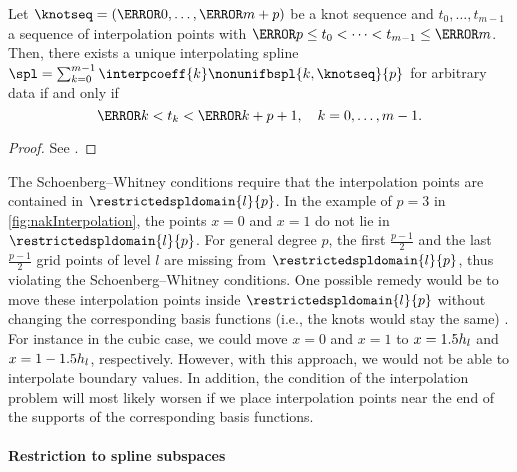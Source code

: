 \begin{proposition}
  Let $\knotseq = (\knot{0}, \dotsc, \knot{m+p})$ be a knot sequence
  and $t_0, \dotsc, t_{m-1}$ a sequence of interpolation points with
  $\knot{p} \le t_0 < \dotsb < t_{m-1} \le \knot{m}$.
  Then, there exists a unique interpolating spline
  $\spl = \sum_{k=0}^{m-1} \interpcoeff{k} \nonunifbspl{k,\knotseq}{p}$
  for arbitrary data if and only if
  \begin{equation}
    \knot{k} < t_k < \knot{k+p+1},\quad
    k = 0, \dotsc, m - 1.
  \end{equation}
\end{proposition}

\begin{proof}
  See \cite{Hoellig13Approximation}.
\end{proof}

The Schoenberg--Whitney conditions require that the interpolation points
are contained in $\restrictedspldomain{l}{p}$.
In the example of $p = 3$ in \cref{fig:nakInterpolation},
the points $x = 0$ and $x = 1$ do not lie in~$\restrictedspldomain{l}{p}$.
For general degree $p$, the first $\tfrac{p-1}{2}$ and the
last $\tfrac{p-1}{2}$ grid points of level $l$ are missing from $\restrictedspldomain{l}{p}$,
thus violating the Schoenberg--Whitney conditions.
One possible remedy would be to move these interpolation points inside
$\restrictedspldomain{l}{p}$ without changing the corresponding basis functions
(i.e., the knots would stay the same) \cite{Hoellig13Approximation}.
For instance in the cubic case, we could move $x = 0$ and $x = 1$ to
$x = 1.5 h_{l}$ and $x = 1 - 1.5 h_{l}$, respectively.
However, with this approach, we would not be able to interpolate
boundary values.
In addition, the condition of the interpolation problem will most likely
worsen if we place interpolation points near the end of the supports
of the corresponding basis functions.

\paragraph{Restriction to spline subspaces}

